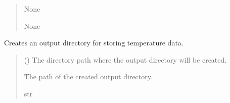 \documentclass[a4paper,11pt,english,openany]{sphinxmanual}
\begin{document}
\begin{fulllineitems}
\begin{fulllineitems}
\begin{quote}
\begin{description}
\sphinxAtStartPar
None

\sphinxAtStartPar
None

\end{description}\end{quote}

\end{fulllineitems}


\end{fulllineitems}


\begin{fulllineitems}
\label{\detokenize{api/spyice.main_process:spyice.main_process.create_output_directory}}
\pysigstartsignatures
{}
\pysigstopsignatures
\sphinxAtStartPar
Creates an output directory for storing temperature data.
\begin{quote}\begin{description}
\sphinxAtStartPar
{} () \textendash{} The directory path where the output directory will be created.

\sphinxAtStartPar
The path of the created output directory.

\sphinxAtStartPar
str

\sphinxAtStartPar
{} \textendash{} 

\end{description}\end{quote}

\end{fulllineitems}


\sphinxstepscope
{}\label{\detokenize{api/spyice.rhs:module-spyice.rhs}}
\end{document}
